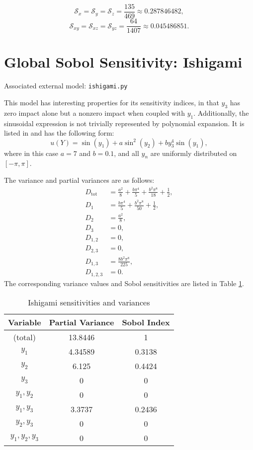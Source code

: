 \begin{equation}
  \mathcal{S}_x =\mathcal{S}_y = \mathcal{S}_z = \frac{135}{469} \approx 0.287846482,
\end{equation}
\begin{equation}
  \mathcal{S}_{xy} =\mathcal{S}_{xz} = \mathcal{S}_{yz} = \frac{64}{1407} \approx 0.045486851.
\end{equation}
%
%
%
%
%
%
%
\section{Global Sobol Sensitivity: Ishigami}
Associated external model: \texttt{ishigami.py}

This model has interesting properties for its sensitivity indices, in that $y_3$ has zero impact alone but a
nonzero impact when coupled with $y_1$.  Additionally, the sinusoidal expression is not trivially represented
by polynomial expansion.  It is listed in \cite{saltelli2000} and has the following form:
\begin{equation}
  u(Y) = \sin(y_1) + a\sin^2(y_2) + b y_3^4\sin(y_1),
\end{equation}
where in this case $a=7$ and $b=0.1$, and all $y_n$ are uniformly distributed on $[-\pi,\pi]$.

The variance and partial variances are as follows:
\begin{align}
  D_\text{tot} &= \frac{a^2}{8} + \frac{b\pi^4}{5} + \frac{b^2\pi^8}{18} + \frac{1}{2}, \\
  D_1 &= \frac{b\pi^4}{5} + \frac{b^2\pi^8}{50} + \frac{1}{2} ,\\
  D_2 &= \frac{a^2}{8}, \\
  D_3 &= 0, \\
  D_{1,2} &= 0, \\
  D_{2,3} &= 0, \\
  D_{1,3} &= \frac{8b^2\pi^8}{225}, \\
  D_{1,2,3} &= 0.
\end{align}
The corresponding variance values and Sobol sensitivities are listed in Table \ref{tab:ishigami sens}.
\begin{table}[h]
  \centering
  \begin{tabular}{c|c|c}
    Variable & Partial Variance & Sobol Index \\ \hline
    (total) & 13.8446 & 1 \\
    $y_1$         & 4.34589 & 0.3138 \\
    $y_2$         & 6.125   & 0.4424 \\
    $y_3$         & 0       & 0      \\
    $y_1,y_2$     & 0       & 0      \\
    $y_1,y_3$     & 3.3737  & 0.2436 \\
    $y_2,y_3$     & 0       & 0      \\
    $y_1,y_2,y_3$ & 0       & 0      \\
  \end{tabular}
  \caption{Ishigami sensitivities and variances}
  \label{tab:ishigami sens}
\end{table}

